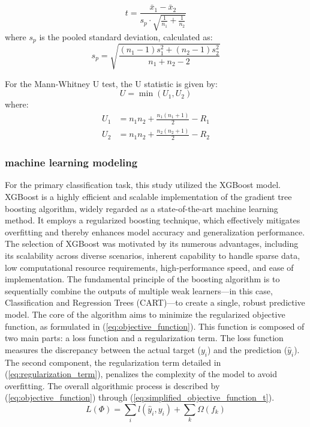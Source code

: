 \begin{equation} \label{eq:t_test}
t = \frac{\bar{x}_1 - \bar{x}_2}{s_p \cdot \sqrt{\frac{1}{n_1} + \frac{1}{n_2}}}
\end{equation}
where $s_p$ is the pooled standard deviation, calculated as:
\begin{equation} \label{eq:sp_pooled}
s_p = \sqrt{\frac{(n_1 - 1)s_1^2 + (n_2 - 1)s_2^2}{n_1 + n_2 - 2}}
\end{equation}

For the Mann-Whitney U test, the U statistic is given by:
\begin{equation} \label{eq:mann_whitney}
U = \min(U_1, U_2)
\end{equation}
where:
\begin{align}
U_1 &= n_1n_2 + \frac{n_1(n_1 + 1)}{2} - R_1 \label{eq:U1} \\
U_2 &= n_1n_2 + \frac{n_2(n_2 + 1)}{2} - R_2 \label{eq:U2}
\end{align}
\subsubsection{machine learning modeling}
For the primary classification task, this study utilized the XGBoost model\cite{mthd05}. XGBoost is a highly efficient and scalable implementation of the gradient tree boosting algorithm, widely regarded as a state-of-the-art machine learning method. It employs a regularized boosting technique, which effectively mitigates overfitting and thereby enhances model accuracy and generalization performance. The selection of XGBoost was motivated by its numerous advantages, including its scalability across diverse scenarios, inherent capability to handle sparse data, low computational resource requirements, high-performance speed, and ease of implementation. The fundamental principle of the boosting algorithm is to sequentially combine the outputs of multiple weak learners---in this case, Classification and Regression Trees (CART)---to create a single, robust predictive model. The core of the algorithm aims to minimize the regularized objective function, as formulated in (\ref{eq:objective_function}). This function is composed of two main parts: a loss function and a regularization term. The loss function measures the discrepancy between the actual target ($y_i$) and the prediction ($\hat{y}_i$). The second component, the regularization term detailed in (\ref{eq:regularization_term}), penalizes the complexity of the model to avoid overfitting. The overall algorithmic process is described by (\ref{eq:objective_function}) through (\ref{eq:simplified_objective_function_t}).
\begin{equation} \label{eq:objective_function}
L(\Phi) = \sum_i l(\hat{y}_i, y_i) + \sum_k \Omega(f_k)
\end{equation}

